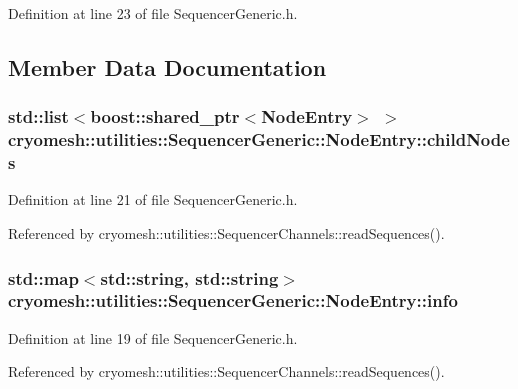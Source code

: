 \-Definition at line 23 of file \-Sequencer\-Generic.\-h.



\subsection{\-Member \-Data \-Documentation}
\hypertarget{structcryomesh_1_1utilities_1_1SequencerGeneric_1_1NodeEntry_aa81743684d922c5af1dca8c15923d272}{
\subsubsection[{child\-Nodes}]{\setlength{\rightskip}{0pt plus 5cm}std\-::list$<$boost\-::shared\-\_\-ptr$<${\bf \-Node\-Entry}$>$ $>$ {\bf cryomesh\-::utilities\-::\-Sequencer\-Generic\-::\-Node\-Entry\-::child\-Nodes}}}\label{structcryomesh_1_1utilities_1_1SequencerGeneric_1_1NodeEntry_aa81743684d922c5af1dca8c15923d272}


\-Definition at line 21 of file \-Sequencer\-Generic.\-h.



\-Referenced by cryomesh\-::utilities\-::\-Sequencer\-Channels\-::read\-Sequences().

\hypertarget{structcryomesh_1_1utilities_1_1SequencerGeneric_1_1NodeEntry_a902d9ca7a5864a758bae3e9eb9de711a}{
\subsubsection[{info}]{\setlength{\rightskip}{0pt plus 5cm}std\-::map$<$std\-::string, std\-::string$>$ {\bf cryomesh\-::utilities\-::\-Sequencer\-Generic\-::\-Node\-Entry\-::info}}}\label{structcryomesh_1_1utilities_1_1SequencerGeneric_1_1NodeEntry_a902d9ca7a5864a758bae3e9eb9de711a}


\-Definition at line 19 of file \-Sequencer\-Generic.\-h.



\-Referenced by cryomesh\-::utilities\-::\-Sequencer\-Channels\-::read\-Sequences().

